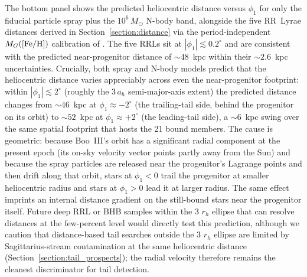 \documentclass[twocolumn]{aastex631}
\begin{document}
The bottom panel shows the predicted heliocentric distance versus $\phi_1$ for only the fiducial particle spray plus the $10^6\,M_\odot$ N-body band, alongside the five RR~Lyrae distances derived in Section~\ref{section:distance} via the period-independent $M_G([{\rm Fe/H}])$ calibration of \citet{Garofalo2022}. The five RRLs sit at $|\phi_1| \lesssim 0.2^\circ$ and
are consistent with the predicted near-progenitor distance of $\sim 48$~kpc within their $\sim 2.6$~kpc uncertainties. Crucially, both spray and N-body models predict that the heliocentric distance varies appreciably across even the near-progenitor footprint: within $|\phi_1| \lesssim 2^\circ$ (roughly the $3\,a_h$ semi-major-axis extent) the predicted distance changes from $\sim 46$~kpc at $\phi_1 \approx -2^\circ$ (the trailing-tail side, behind the progenitor on its orbit) to $\sim 52$~kpc at $\phi_1 \approx +2^\circ$ (the leading-tail side), a $\sim 6$~kpc swing over the same spatial footprint that hosts the 21 bound members. The cause is geometric: because Boo~III's orbit has a significant radial component at the present epoch (its on-sky velocity vector points partly away from the Sun) and because the spray particles are released near the progenitor's Lagrange points and then drift along that orbit, stars at $\phi_1 < 0$ trail the progenitor at smaller heliocentric radius and stars at $\phi_1 > 0$ lead it at larger radius. The same effect imprints an internal distance gradient on the still-bound stars near the progenitor itself.
Future deep RRL or BHB samples within the 3 $r_h$ ellipse that can resolve distances at the few-percent level would directly test this prediction, although we caution that distance-based tail searches outside the 3 $r_h$ ellipse are limited by Sagittarius-stream contamination at the same heliocentric distance (Section~\ref{section:tail_prospects}); the radial velocity therefore remains the cleanest discriminator for tail detection.
\end{document}
